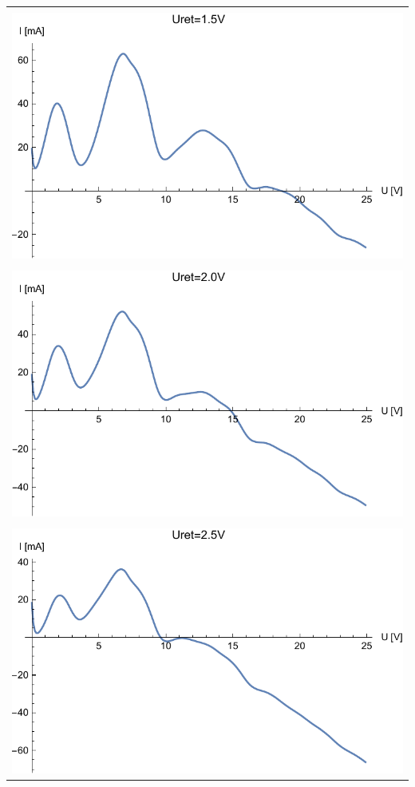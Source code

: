 \documentclass[paper=a4, fontsize=12pt]{scrartcl}
\begin{document}
{{\begin{tabular}{|c|}
	\hline\\
\includegraphics[width=0.7\linewidth]{wyk11}
\label{fig:wyk11}\\
\hline\\
	\includegraphics[width=0.7\linewidth]{wyk14}
	\label{fig:wyk14}\\
	\hline\\
	\includegraphics[width=0.7\linewidth]{wyk15}
	\label{fig:wyk15}\\
	\hline
\end{tabular}
}}
\end{document}
